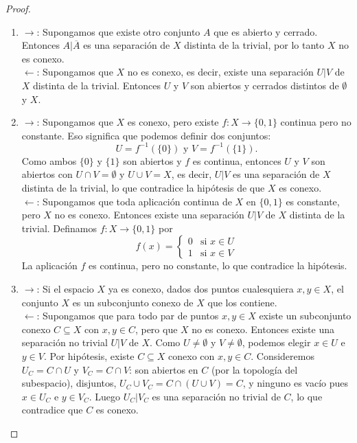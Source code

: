 \begin{proof}
    \begin{enumerate}
        \item $\rightarrow$: Supongamos que existe otro conjunto $A$ que es abierto y cerrado. Entonces $A|\overline{A}$ es una separación de $X$ distinta de la trivial, por lo tanto $X$ no es conexo. \\ 
        $\leftarrow$: Supongamos que $X$ no es conexo, es decir, existe una separación $U|V$ de $X$ distinta de la trivial. Entonces $U$ y $V$ son abiertos y cerrados distintos de $\emptyset$ y $X$.
        \item $\rightarrow$: Supongamos que $X$ es conexo, pero existe $f: X \to \{0, 1\}$ continua pero no constante. Eso significa que podemos definir dos conjuntos: 
    $$U = f^{-1}(\{0\}) \text{ y } V = f^{-1}(\{1\}).$$
    Como ambos $\{0\}$ y $\{1\}$ son abiertos y $f$ es continua, entonces $U$ y $V$ son abiertos con $U \cap V = \emptyset$ y $U \cup V = X$, es decir, $U|V$ es una separación de $X$ distinta de la trivial, lo que contradice la hipótesis de que $X$ es conexo. \\
    $\leftarrow$: Supongamos que toda aplicación continua de $X$ en $\{0, 1\}$ es constante, pero $X$ no es conexo. Entonces existe una separación $U|V$ de $X$ distinta de la trivial. Definamos $f: X \to \{0, 1\}$ por $$f(x) = \begin{cases} 0 & \text{si } x \in U \\ 1 & \text{si } x \in V \end{cases}$$
    La aplicación $f$ es continua, pero no constante, lo que contradice la hipótesis.
    \item $\rightarrow$: Si el espacio $X$ ya es conexo, dados dos puntos cualesquiera $x, y \in X$, el conjunto $X$ es un subconjunto conexo de $X$ que los contiene. \\
    $\leftarrow$: Supongamos que para todo par de puntos $x, y \in X$ existe un subconjunto conexo $C \subseteq X$ con $x, y \in C$, pero que $X$ no es conexo. Entonces existe una separación no trivial $U|V$ de $X$. Como $U \neq \emptyset$ y $V \neq \emptyset$, podemos elegir $x \in U$ e $y \in V$. Por hipótesis, existe $C \subseteq X$ conexo con $x, y \in C$. Consideremos $U_C = C \cap U$ y $V_C = C \cap V$: son abiertos en $C$ (por la topología del subespacio), disjuntos, $U_C \cup V_C = C \cap (U \cup V) = C$, y ninguno es vacío pues $x \in U_C$ e $y \in V_C$. Luego $U_C|V_C$ es una separación no trivial de $C$, lo que contradice que $C$ es conexo.
    \end{enumerate}
\end{proof}
